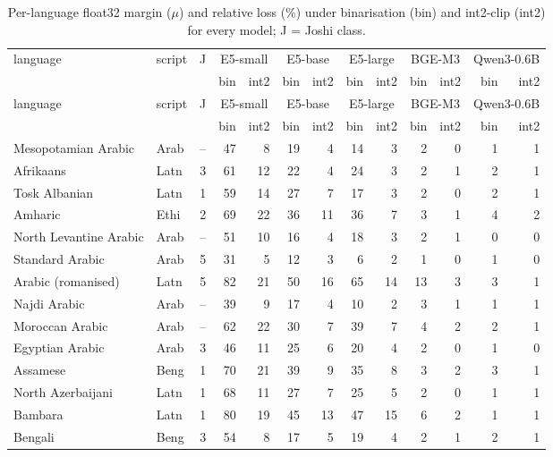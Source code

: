 \begin{small}
\begin{longtable}{llrrrrrrrrrrr}
\caption{Per-language float32 margin ($\mu$) and relative loss (\%) under binarisation (bin) and int2-clip (int2) for every model; J = Joshi class.}\label{tab:perlang}\\
\toprule
language & script & J & \multicolumn{2}{c}{E5-small} & \multicolumn{2}{c}{E5-base} & \multicolumn{2}{c}{E5-large} & \multicolumn{2}{c}{BGE-M3} & \multicolumn{2}{c}{Qwen3-0.6B} \\
 & & & bin & int2 & bin & int2 & bin & int2 & bin & int2 & bin & int2 \\
\midrule
\endfirsthead
\toprule
language & script & J & \multicolumn{2}{c}{E5-small} & \multicolumn{2}{c}{E5-base} & \multicolumn{2}{c}{E5-large} & \multicolumn{2}{c}{BGE-M3} & \multicolumn{2}{c}{Qwen3-0.6B} \\
 & & & bin & int2 & bin & int2 & bin & int2 & bin & int2 & bin & int2 \\
\midrule
\endhead
\bottomrule
\endfoot
Mesopotamian Arabic & Arab & -- & 47 & 8 & 19 & 4 & 14 & 3 & 2 & 0 & 1 & 1 \\
Afrikaans & Latn & 3 & 61 & 12 & 22 & 4 & 24 & 3 & 2 & 1 & 2 & 1 \\
Tosk Albanian & Latn & 1 & 59 & 14 & 27 & 7 & 17 & 3 & 2 & 0 & 2 & 1 \\
Amharic & Ethi & 2 & 69 & 22 & 36 & 11 & 36 & 7 & 3 & 1 & 4 & 2 \\
North Levantine Arabic & Arab & -- & 51 & 10 & 16 & 4 & 18 & 3 & 2 & 1 & 0 & 0 \\
Standard Arabic & Arab & 5 & 31 & 5 & 12 & 3 & 6 & 2 & 1 & 0 & 1 & 0 \\
Arabic (romanised) & Latn & 5 & 82 & 21 & 50 & 16 & 65 & 14 & 13 & 3 & 3 & 1 \\
Najdi Arabic & Arab & -- & 39 & 9 & 17 & 4 & 10 & 2 & 3 & 1 & 1 & 1 \\
Moroccan Arabic & Arab & -- & 62 & 22 & 30 & 7 & 39 & 7 & 4 & 2 & 2 & 1 \\
Egyptian Arabic & Arab & 3 & 46 & 11 & 25 & 6 & 20 & 4 & 2 & 0 & 1 & 0 \\
Assamese & Beng & 1 & 70 & 21 & 39 & 9 & 35 & 8 & 3 & 2 & 3 & 1 \\
North Azerbaijani & Latn & 1 & 68 & 11 & 27 & 7 & 25 & 5 & 2 & 0 & 1 & 1 \\
Bambara & Latn & 1 & 80 & 19 & 45 & 13 & 47 & 15 & 6 & 2 & 1 & 1 \\
Bengali & Beng & 3 & 54 & 8 & 17 & 5 & 19 & 4 & 2 & 1 & 2 & 1 \\

\end{longtable}
\end{small}
